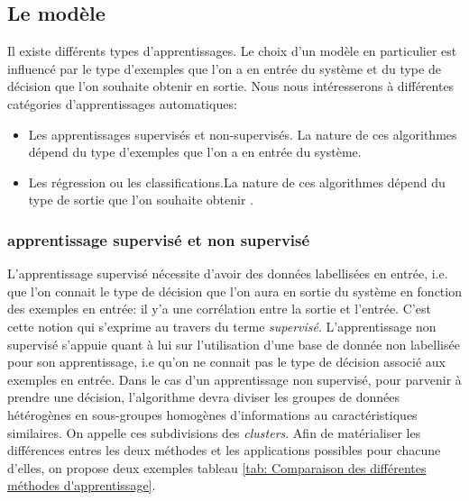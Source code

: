 \subsection{Le modèle}
\label{Le Machine Learning: Généralités sur le Machine Learning: Le modèle}
Il existe différents types d'apprentissages. Le choix d'un modèle en particulier est influencé par le type d'exemples que l'on a en entrée du système et du type de décision que l'on souhaite obtenir en sortie. Nous nous intéresserons à différentes catégories d'apprentissages automatiques: 
\begin{itemize}
	\item Les apprentissages supervisés et non-supervisés. La nature de ces algorithmes dépend du type d'exemples que l'on a en entrée du système.
	\item Les régression ou les classifications.La nature de ces algorithmes dépend du type de sortie que l'on souhaite obtenir . 
\end{itemize}


\subsubsection{apprentissage supervisé et non supervisé} 
\label{Le Machine Learning: Généralités sur le Machine Learning: Le modèle: apprentissage supervisé et non supervisé}
L'apprentissage supervisé nécessite d'avoir des données labellisées en entrée, i.e. que l'on connait le type de décision que l'on aura en sortie du système en fonction des exemples en entrée: il y'a une corrélation entre la sortie et l'entrée. C'est cette notion qui s'exprime au travers du terme \emph{supervisé}. 
L'apprentissage non supervisé s'appuie quant à lui sur l'utilisation d'une base de donnée non labellisée pour son apprentissage, i.e qu'on ne connait pas le type de décision associé aux exemples en entrée. Dans le cas d'un apprentissage non supervisé, pour parvenir à prendre une décision, l'algorithme devra diviser les groupes de données hétérogènes en sous-groupes homogènes d'informations au caractéristiques similaires. On appelle ces subdivisions des \emph{clusters}.
Afin de matérialiser les différences entres les deux méthodes et les applications possibles pour chacune d'elles, on propose deux exemples tableau \ref {tab: Comparaison des différentes méthodes d'apprentissage}.

